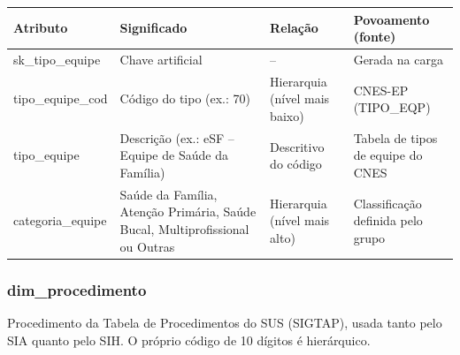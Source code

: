 \documentclass[12pt,a4paper]{article}
\begin{document}
{\small{}\begin{longtable}{|>{\raggedright\arraybackslash}p{}|>{\raggedright\arraybackslash}p{}|>{\raggedright\arraybackslash}p{}|>{\raggedright\arraybackslash}p{}|}\hline\rowcolor{azul}\color{white}\bfseries Atributo & \color{white}\bfseries Significado & \color{white}\bfseries Relação & \color{white}\bfseries Povoamento (fonte) \\ \hline\endhead
sk\_\allowbreak{}tipo\_\allowbreak{}equipe & Chave artificial & – & Gerada na carga \\ \hline
tipo\_\allowbreak{}equipe\_\allowbreak{}cod & Código do tipo (ex.: 70) & Hierarquia (nível mais baixo) & CNES-EP (TIPO\_\allowbreak{}EQP) \\ \hline
tipo\_\allowbreak{}equipe & Descrição (ex.: eSF – Equipe de Saúde da Família) & Descritivo do código & Tabela de tipos de equipe do CNES \\ \hline
categoria\_\allowbreak{}equipe & Saúde da Família, Atenção Primária, Saúde Bucal, Multiprofissional ou Outras & Hierarquia (nível mais alto) & Classificação definida pelo grupo \\ \hline\end{longtable}}

\subsubsection*{dim\_\allowbreak{}procedimento}

Procedimento da Tabela de Procedimentos do SUS (SIGTAP), usada tanto pelo SIA quanto pelo SIH. O próprio código de 10 dígitos é hierárquico.
\end{document}
